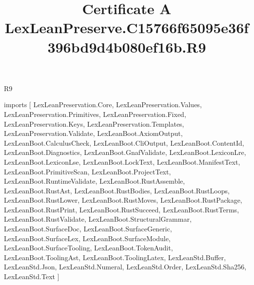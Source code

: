 \begin{lexlean}{R9}
\title{Certificate A LexLeanPreserve.C15766f65095e36f396bd9d4b080ef16b.R9}
\begin{coremodule}
imports [
  LexLeanPreservation.Core,
  LexLeanPreservation.Values,
  LexLeanPreservation.Primitives,
  LexLeanPreservation.Fixed,
  LexLeanPreservation.Keys,
  LexLeanPreservation.Templates,
  LexLeanPreservation.Validate,
  LexLeanBoot.AxiomOutput,
  LexLeanBoot.CalculusCheck,
  LexLeanBoot.CliOutput,
  LexLeanBoot.ContentId,
  LexLeanBoot.Diagnostics,
  LexLeanBoot.GnafValidate,
  LexLeanBoot.LexiconLre,
  LexLeanBoot.LexiconLse,
  LexLeanBoot.LockText,
  LexLeanBoot.ManifestText,
  LexLeanBoot.PrimitiveScan,
  LexLeanBoot.ProjectText,
  LexLeanBoot.RuntimeValidate,
  LexLeanBoot.RustAssemble,
  LexLeanBoot.RustAst,
  LexLeanBoot.RustBodies,
  LexLeanBoot.RustLoops,
  LexLeanBoot.RustLower,
  LexLeanBoot.RustMoves,
  LexLeanBoot.RustPackage,
  LexLeanBoot.RustPrint,
  LexLeanBoot.RustSucceed,
  LexLeanBoot.RustTerms,
  LexLeanBoot.RustValidate,
  LexLeanBoot.StructuralGrammar,
  LexLeanBoot.SurfaceDoc,
  LexLeanBoot.SurfaceGeneric,
  LexLeanBoot.SurfaceLex,
  LexLeanBoot.SurfaceModule,
  LexLeanBoot.SurfaceTooling,
  LexLeanBoot.TokenAudit,
  LexLeanBoot.ToolingAst,
  LexLeanBoot.ToolingLatex,
  LexLeanStd.Buffer,
  LexLeanStd.Json,
  LexLeanStd.Numeral,
  LexLeanStd.Order,
  LexLeanStd.Sha256,
  LexLeanStd.Text
]


\end{coremodule}
\end{lexlean}
